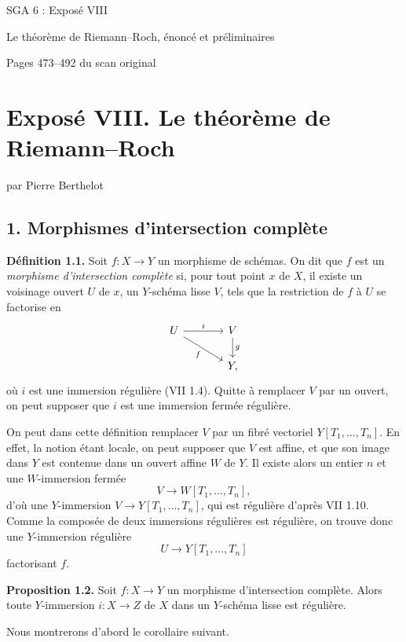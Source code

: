 \documentclass[11pt]{article}
\begin{document}
\begin{center}
{\Large SGA 6 : Exposé VIII}\par
{\large Le théorème de Riemann--Roch, énoncé et préliminaires}\par
{\large Pages 473--492 du scan original}
\end{center}


\section*{Exposé VIII. Le théorème de Riemann--Roch}
\begin{center}
par Pierre Berthelot
\end{center}

\subsection*{1. Morphismes d'intersection complète}

\textbf{Définition 1.1.} Soit $f:X\to Y$ un morphisme de schémas. On dit que $f$ est un \emph{morphisme d'intersection complète} si, pour tout point $x$ de $X$, il existe un voisinage ouvert $U$ de $x$, un $Y$-schéma lisse $V$, tels que la restriction de $f$ à $U$ se factorise en
\[
\begin{tikzcd}[column sep=large]
U \arrow[r,"i"] \arrow[dr,"f"'] & V \arrow[d,"g"]\\
& Y,
\end{tikzcd}
\]
où $i$ est une immersion régulière (VII 1.4). Quitte à remplacer $V$ par un ouvert, on peut supposer que $i$ est une immersion fermée régulière.

On peut dans cette définition remplacer $V$ par un fibré vectoriel $Y[T_1,\ldots,T_n]$. En effet, la notion étant locale, on peut supposer que $V$ est affine, et que son image dans $Y$ est contenue dans un ouvert affine $W$ de $Y$. Il existe alors un entier $n$ et une $W$-immersion fermée
\[
V\longrightarrow W[T_1,\ldots,T_n],
\]
d'où une $Y$-immersion $V\to Y[T_1,\ldots,T_n]$, qui est régulière d'après VII 1.10. Comme la composée de deux immersions régulières est régulière, on trouve donc une $Y$-immersion régulière
\[
U\longrightarrow Y[T_1,\ldots,T_n]
\]
factorisant $f$.

\textbf{Proposition 1.2.} Soit $f:X\to Y$ un morphisme d'intersection complète. Alors toute $Y$-immersion $i:X\to Z$ de $X$ dans un $Y$-schéma lisse est régulière.

Nous montrerons d'abord le corollaire suivant.
\end{document}
